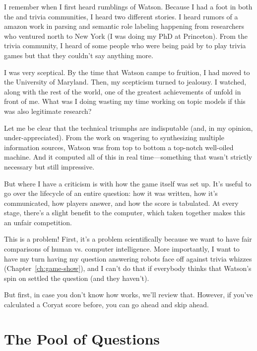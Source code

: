 

I remember when I first heard rumblings of Watson.
%
Because I had a foot in both the  and trivia communities, I
heard two different stories.
%
I heard rumors of a amazon work in parsing and semantic role labeling
happening from researchers who ventured north to New York (I was doing
my PhD at Princeton).
%
From the trivia community, I heard of some people who were being paid
by  to play trivia games but that they couldn't say anything
more.

I was very sceptical.
%
By the time that Watson campe to fruition, I had moved to the
University of Maryland.
%
Then, my scepticism turned to jealousy.
%
I watched, along with the rest of the world, one of the greatest
achievements of  unfold in front of me.
%
What was I doing wasting my time working on topic models if this was
also legitimate research?

Let me be clear that the technical triumphs are indisputable (and, in
my opinion, under-appreciated).
%
From the work on wagering to synthesizing multiple information
sources, Watson was from top to bottom a top-notch well-oiled machine.
%
And it computed all of this in real time---something that wasn't
strictly necessary but still impressive.

But where I have a criticism is with how the game itself was set up.
%
It's useful to go over the lifecycle of an entire question: how it was
written, how it's communicated, how players answer, and how the score
is tabulated.
%
At every stage, there's a slight benefit to the computer, which taken
together makes this an unfair competition.

This is a problem!  First, it's a problem scientifically because we
want to have fair comparisons of human vs. computer intelligence.
%
More importantly, I want to have my turn having my question answering
robots face off against trivia whizzes (Chapter~\ref{ch:game-show}),
and I can't do that if everybody thinks that Watson's spin
on \jeopardy{} settled the question (and they haven't).


But first, in case you don't know how \jeopardy{} works, we'll review
that.
%
However, if you've calculated a Coryat score before, you can go ahead
and skip ahead.

\section{The Pool of Questions}


